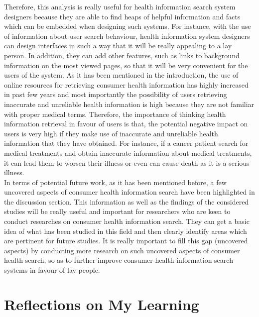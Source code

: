 \documentclass[]{article}
\begin{document}
Therefore, this analysis is really useful for health information search system designers because they are able to find heaps of helpful information and facts which can be embedded when designing such systems. For instance, with the use of information about user search behaviour, health information system designers can design interfaces in such a way that it will be really appealing to a lay person. In addition, they can add other features, such as links to background information on the most viewed pages, so that it will be very convenient for the users of the system.  As it has been mentioned in the introduction, the use of online resources for retrieving consumer health information has highly increased in past few years and most importantly the possibility of users retrieving inaccurate and unreliable health information is high because they are not familiar with proper medical terms. Therefore, the importance of thinking health information retrieval in favour of users is that, the potential negative impact on users is very high if they make use of inaccurate and unreliable health information that they have obtained. For instance, if a cancer patient search for medical treatments and obtain inaccurate information about medical treatments, it can lead them to worsen their illness or even can cause death as it is a serious illness.\\
  
In terms of potential future work, as it has been mentioned before, a few uncovered aspects of consumer health information search have been highlighted in the discussion section. This information as well as the findings of the considered studies will be really useful and important for researchers who are keen to conduct researches on consumer health information search. They can get a basic idea of what has been studied in this field and then clearly identify areas which are pertinent for future studies. It is really important to fill this gap (uncovered aspects) by conducting more research on such uncovered aspects of consumer health search, so as to further improve consumer health information search systems in favour of lay people. 

\section{Reflections on My Learning}
\end{document}
